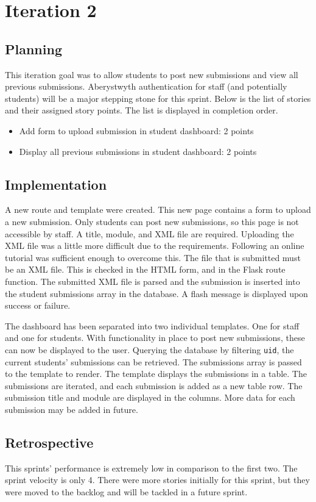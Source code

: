 \chapter{Iteration 2}
\section{Planning}
This iteration goal was to allow students to post new submissions and view all previous submissions. Aberystwyth authentication for staff (and potentially students) will be a major stepping stone for this sprint. Below is the list of stories and their assigned story points. The list is displayed in completion order.

\begin{itemize}
\item Add form to upload submission in student dashboard: 2 points
\item Display all previous submissions in student dashboard: 2 points
\end{itemize}

\section{Implementation}
A new route and template were created. This new page contains a form to upload a new submission. Only students can post new submissions, so this page is not accessible by staff. A title, module, and XML file are required. Uploading the XML file was a little more difficult due to the requirements. Following an online tutorial was sufficient enough to overcome this\cite{FlaskUploadingFiles}. The file that is submitted must be an XML file. This is checked in the HTML form, and in the Flask route function. The submitted XML file is parsed and the submission is inserted into the student submissions array in the database. A flash message is displayed upon success or failure.

The dashboard has been separated into two individual templates. One for staff and one for students. With functionality in place to post new submissions, these can now be displayed to the user. Querying the database by filtering \texttt{uid}, the current students' submissions can be retrieved. The submissions array is passed to the template to render. The template displays the submissions in a table. The submissions are iterated, and each submission is added as a new table row. The submission title and module are displayed in the columns. More data for each submission may be added in future.

\section{Retrospective}
This sprints' performance is extremely low in comparison to the first two. The sprint velocity is only 4. There were more stories initially for this sprint, but they were moved to the backlog and will be tackled in a future sprint.
